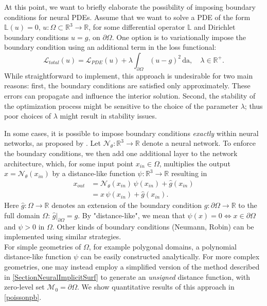 \documentclass[draft,12pt,openany]{book}
\newcommand{\R}{\mathbb{R}}
\theoremstyle{plainnormal}
\theoremstyle{remark}
\begin{document}
At this point, we want to briefly elaborate the possibility of imposing boundary conditions for neural PDEs. Assume that we want to solve a PDE of the form $\mathbb{L}(u) = 0, \, u:\Omega\subset\R^3\rightarrow\R$, for some differential operator $\mathbb{L}$ and Dirichlet boundary conditions $ u = g \text{, on }\partial\Omega$. One option is to variationally impose the boundary condition using an additional term in the loss functional: $$\mathcal L_{total}(u) = \mathcal{L}_{PDE}(u) + \lambda \int_{\partial \Omega} (u - g) ^2\, \mathrm{da}, \quad \lambda \in\R^+.$$
While straightforward to implement, this approach is undesirable for two main reasons: first, the boundary conditions are satisfied only approximately. These errors can propagate and influence the interior solution.  Second, the stability of the optimization process might be sensitive to the choice of the parameter $\lambda$; thus poor choices of $\lambda$ might result in stability issues.\par
In some cases, it is possible to impose boundary conditions \emph{exactly} within neural networks, as proposed by \cite{BERRONE2023e18820}. Let $\mathcal{N}_\theta: \R^3 \rightarrow \R$ denote a neural network. To enforce the boundary conditions, we then add one additional layer to the network architecture, which, for some input point $x_{in} \in \Omega$, multiplies the output $x= \mathcal N _\theta(x_{in})$  by a distance-like function $\psi: \R^3 \rightarrow\R$ resulting in 
\begin{align*}
    x_{out} &= \mathcal N_\theta(x_{in})\,\psi(x_{in}) + \hat g(x_{in}) \\&= x\,\psi(x_{in})+ \hat g(x_{in}).
\end{align*}
Here $\hat{g}: \Omega \rightarrow\R$ denotes an extension of the boundary condition $g: \partial \Omega \rightarrow \R $ to the full domain $\Omega$: $\hat g|_{\partial \Omega} = g$. By "distance-like", we mean that $\psi(x) = 0 \Leftrightarrow x \in \partial  \Omega$ and $\psi > 0$ in $\Omega$. Other kinds of boundary conditions (Neumann, Robin) can be implemented using similar strategies. \\
For simple geometries of $\Omega$, for example polygonal domains, a polynomial distance-like function $\psi$ can be easily constructed analytically. For more complex geometries, one may instead employ a simplified version of the method described in \cref{SectionNeuralImplicitSurf} to generate an \emph{unsigned} distance function, with zero-level set $\mathcal M_0 = \partial \Omega$. We show quantitative results of this approach in \cref{poissonpb}.
\end{document}
